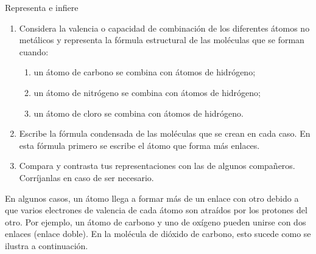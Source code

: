 \begin{boxK}
    Representa e infiere
    \begin{enumerate}
        \item Considera la valencia o capacidad de combinación de los diferentes átomos no metálicos y representa la fórmula estructural de las moléculas que se forman cuando:
              \begin{enumerate}
                  \item un átomo de carbono se combina con átomos de hidrógeno;
                  \item un átomo de nitrógeno se combina con átomos de hidrógeno;
                  \item un átomo de cloro se combina con átomos de hidrógeno.
              \end{enumerate}
        \item Escribe la fórmula condensada de las moléculas que se crean en cada caso. En esta fórmula primero se escribe el átomo que forma más enlaces.
        \item Compara y contrasta tus representaciones con las de algunos compañeros. Corríjanlas en caso de ser necesario.
    \end{enumerate}
\end{boxK}

En algunos casos, un átomo llega a formar más de un enlace con otro debido a que varios electrones de valencia de cada átomo son atraídos por los protones del otro. Por ejemplo, un átomo de carbono y uno de oxígeno pueden unirse con dos enlaces (enlace doble). En la molécula de dióxido de carbono, esto sucede como se ilustra a continuación.

